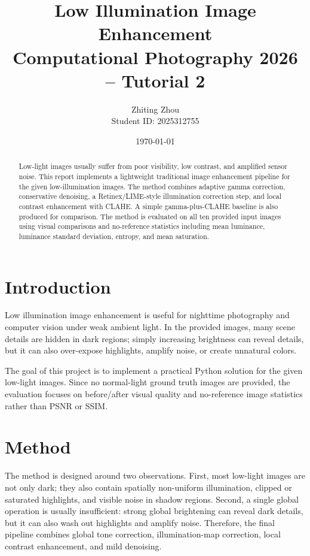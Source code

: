 \documentclass[11pt,a4paper]{article}
\title{\textbf{Low Illumination Image Enhancement}\\
\large Computational Photography 2026 -- Tutorial 2}
\author{Zhiting Zhou\\Student ID: 2025312755}
\date{\today}
\begin{document}
\maketitle

\begin{abstract}
Low-light images usually suffer from poor visibility, low contrast, and amplified sensor noise. This report implements a lightweight traditional image enhancement pipeline for the given low-illumination images. The method combines adaptive gamma correction, conservative denoising, a Retinex/LIME-style illumination correction step, and local contrast enhancement with CLAHE. A simple gamma-plus-CLAHE baseline is also produced for comparison. The method is evaluated on all ten provided input images using visual comparisons and no-reference statistics including mean luminance, luminance standard deviation, entropy, and mean saturation.
\end{abstract}

\section{Introduction}

Low illumination image enhancement is useful for nighttime photography and computer vision under weak ambient light. In the provided images, many scene details are hidden in dark regions; simply increasing brightness can reveal details, but it can also over-expose highlights, amplify noise, or create unnatural colors.

The goal of this project is to implement a practical Python solution for the given low-light images. Since no normal-light ground truth images are provided, the evaluation focuses on before/after visual quality and no-reference image statistics rather than PSNR or SSIM.

\section{Method}

The method is designed around two observations. First, most low-light images are not only dark; they also contain spatially non-uniform illumination, clipped or saturated highlights, and visible noise in shadow regions. Second, a single global operation is usually insufficient: strong global brightening can reveal dark details, but it can also wash out highlights and amplify noise. Therefore, the final pipeline combines global tone correction, illumination-map correction, local contrast enhancement, and mild denoising.
\end{document}
